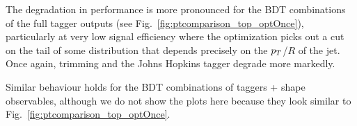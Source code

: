 The degradation in performance is more pronounced for the BDT combinations of the full tagger outputs (see Fig.~\ref{fig:ptcomparison_top_optOnce}), particularly at very low signal efficiency where the optimization picks out a cut on the tail of some distribution that depends precisely on the $p_T$/$R$ of the jet. Once again, trimming and the Johns Hopkins tagger degrade more markedly.   

Similar behaviour holds for the BDT combinations of taggers + shape observables, although we do not show the plots here because they look similar to Fig.~\ref{fig:ptcomparison_top_optOnce}.\\

\begin{figure}
\begin{center}

\end{center}
\end{figure}
